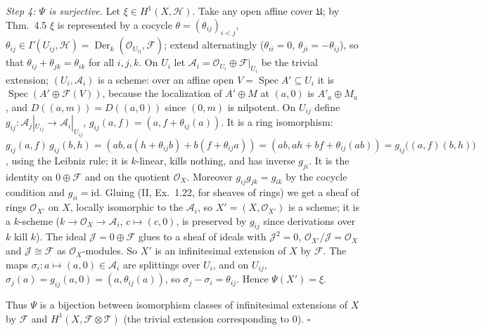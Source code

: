 \documentclass[11pt]{article}
\begin{document}
\emph{Step 4: $\Psi$ is surjective.} Let $\xi\in H^1(X,\mathcal H)$. Take any open affine cover $\mathfrak U$; by Thm.~4.5 $\xi$ is represented by a cocycle $\theta=(\theta_{ij})_{i<j}$, $\theta_{ij}\in\Gamma(U_{ij},\mathcal H)=\operatorname{Der}_k(\mathcal O_{U_{ij}},\mathcal F)$; extend alternatingly ($\theta_{ii}=0$, $\theta_{ji}=-\theta_{ij}$), so that $\theta_{ij}+\theta_{jk}=\theta_{ik}$ for all $i,j,k$. On $U_i$ let $\mathcal A_i=\mathcal O_{U_i}\oplus\mathcal F|_{U_i}$ be the trivial extension; $(U_i,\mathcal A_i)$ is a scheme: over an affine open $V=\operatorname{Spec}A'\subseteq U_i$ it is $\operatorname{Spec}(A'\oplus\mathcal F(V))$, because the localization of $A'\oplus M$ at $(a,0)$ is $A'_a\oplus M_a$, and $D((a,m))=D((a,0))$ since $(0,m)$ is nilpotent. On $U_{ij}$ define $g_{ij}:\mathcal A_j|_{U_{ij}}\to\mathcal A_i|_{U_{ij}}$, $g_{ij}(a,f)=(a,f+\theta_{ij}(a))$. It is a ring isomorphism: $g_{ij}(a,f)\,g_{ij}(b,h)=(ab,a(h+\theta_{ij}b)+b(f+\theta_{ij}a))=(ab,ah+bf+\theta_{ij}(ab))=g_{ij}\big((a,f)(b,h)\big)$, using the Leibniz rule; it is $k$-linear, kills nothing, and has inverse $g_{ji}$. It is the identity on $0\oplus\mathcal F$ and on the quotient $\mathcal O_X$. Moreover $g_{ij}g_{jk}=g_{ik}$ by the cocycle condition and $g_{ii}=\mathrm{id}$. Gluing (II, Ex.~1.22, for sheaves of rings) we get a sheaf of rings $\mathcal O_{X'}$ on $X$, locally isomorphic to the $\mathcal A_i$, so $X'=(X,\mathcal O_{X'})$ is a scheme; it is a $k$-scheme ($k\to\mathcal O_X\to\mathcal A_i$, $c\mapsto(c,0)$, is preserved by $g_{ij}$ since derivations over $k$ kill $k$). The ideal $\mathcal J=0\oplus\mathcal F$ glues to a sheaf of ideals with $\mathcal J^2=0$, $\mathcal O_{X'}/\mathcal J=\mathcal O_X$ and $\mathcal J\cong\mathcal F$ as $\mathcal O_X$-modules. So $X'$ is an infinitesimal extension of $X$ by $\mathcal F$. The maps $\sigma_i:a\mapsto(a,0)\in\mathcal A_i$ are splittings over $U_i$, and on $U_{ij}$, $\sigma_j(a)=g_{ij}(a,0)=(a,\theta_{ij}(a))$, so $\sigma_j-\sigma_i=\theta_{ij}$. Hence $\Psi(X')=\xi$.

Thus $\Psi$ is a bijection between isomorphism classes of infinitesimal extensions of $X$ by $\mathcal F$ and $H^1(X,\mathcal F\otimes\mathcal T)$ (the trivial extension corresponding to $0$). \hfill$\square$
\end{document}
